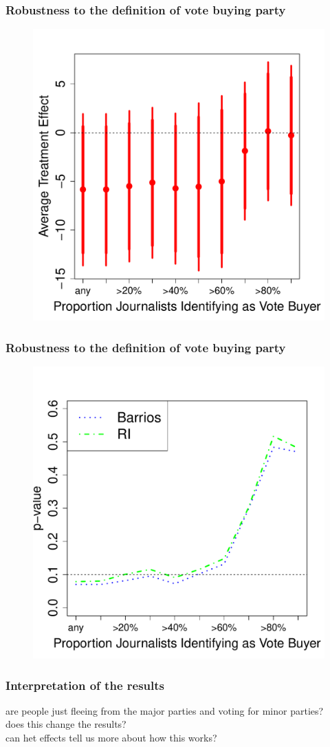 \documentclass{beamer}
\begin{document}
\begin{frame}
\frametitle{Robustness to the definition of vote buying party}

\begin{figure}
\centering
\includegraphics[width=.6\textwidth]{../Figures/coef_journo_defn}
\end{figure}

\end{frame}



\begin{frame}
\frametitle{Robustness to the definition of vote buying party}

\begin{figure}
\centering
\includegraphics[width=.6\textwidth]{../Figures/p_journo_defn}
\end{figure}

\end{frame}



\begin{frame}
\frametitle{Interpretation of the results}

are people just fleeing from the major parties and voting for minor parties?\\
does this change the results? \\
can het effects tell us more about how this works?

\end{frame}
\end{document}
